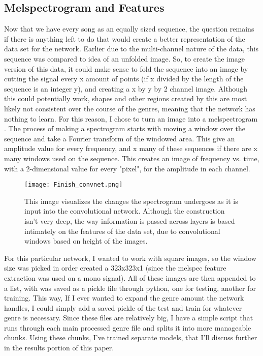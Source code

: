 \documentclass[10pt,twocolumn,letterpaper]{article}
\begin{document}
\subsection{Melspectrogram and Features}
Now that we have every song as an equally sized sequence, the question remains if there is anything left to do that would create a better representation of the data set for the network. Earlier due to the multi-channel nature of the data, this sequence was compared to idea of an unfolded image. So, to create the image version of this data, it could make sense to fold the sequence into an image by cutting the signal every x amount of points (if x divided by the length of the sequence is an integer y), and creating a x by y by 2 channel image. Although this could potentially work, shapes and other regions created by this are most likely not consistent over the course of the genres, meaning that the network has nothing to learn. For this reason, I chose to turn an image into a melspectrogram \cite{librosa}. The process of making a spectrogram starts with moving a window over the sequence and take a Fourier transform of the windowed area. This give an amplitude value for every frequency, and x many of these sequences if there are x many windows used on the sequence. This creates an image of frequency vs. time, with a 2-dimensional value for every "pixel", for the amplitude in each channel.
\begin{figure*}
    \texttt{[image: Finish\_convnet.png]}
    \caption{This image visualizes the changes the spectrogram undergoes as it is input into the convolutional network. Although the construction isn't very deep, the way information is passed across layers is based intimately on the features of the data set, due to convolutional windows based on height of the images.}
\end{figure*}
For this particular network, I wanted to work with square images, so the window size was picked in order created a 323x323x1 (since the melspec feature extraction was used on a mono signal). All of these images are then appended to a list, with was saved as a pickle file through python, one for testing, another for training. This way, If I ever wanted to expand the genre amount the network handles, I could simply add a saved pickle of the test and train for whatever genre is necessary. Since these files are relatively big, I have a simple script that runs through each main processed genre file and splits it into more manageable chunks. Using these chunks, I've trained separate models, that I'll discuss further in the results portion of this paper.
\end{document}
